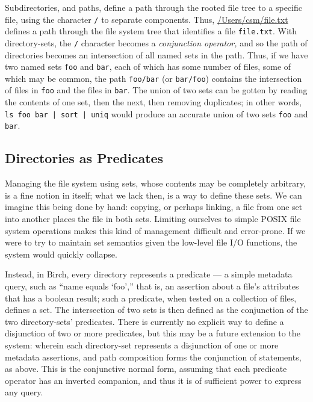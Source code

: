 \documentclass{article}
\begin{document}
Subdirectories, and paths, define a path through the rooted file tree
to a specific file, using the character \texttt{/} to separate
components. Thus, \url{/Users/csm/file.txt} defines a path through
the file system tree that identifies a file \texttt{file.txt}. With
directory-sets, the \texttt{/} character becomes a \emph{conjunction
  operator,} and so the path of directories becomes an intersection of
all named sets in the path. Thus, if we have two named sets
\texttt{foo} and \texttt{bar}, each of which has some number of files,
some of which may be common, the path \texttt{foo/bar} (or
\texttt{bar/foo}) contains the intersection of files in \texttt{foo}
and the files in \texttt{bar}. The union of two sets can be gotten by
reading the contents of one set, then the next, then removing
duplicates; in other words, \texttt{ls foo bar | sort | uniq} would
produce an accurate union of two sets \texttt{foo} and \texttt{bar}.

\subsection{Directories as Predicates}

Managing the file system using sets, whose contents may be completely
arbitrary, is a fine notion in itself; what we lack then, is a way to
define these sets. We can imagine this being done by hand: copying, or
perhaps linking, a file from one set into another places the file in
both sets. Limiting ourselves to simple POSIX file system operations
makes this kind of management difficult and error-prone. If we were to
try to maintain set semantics given the low-level file I/O functions,
the system would quickly collapse.

Instead, in Birch, every directory represents a predicate --- a simple
metadata query, such as ``name equals `foo','' that is, an assertion
about a file's attributes that has a boolean result; such a predicate,
when tested on a collection of files, defines a set. The intersection
of two sets is then defined as the conjunction of the two
directory-sets' predicates. There is currently no explicit way to
define a disjunction of two or more predicates, but this may be a
future extension to the system: wherein each directory-set represents
a disjunction of one or more metadata assertions, and path composition
forms the conjunction of statements, as above. This is the conjunctive
normal form, assuming that each predicate operator has an inverted
companion, and thus it is of sufficient power to express any query.
\end{document}
